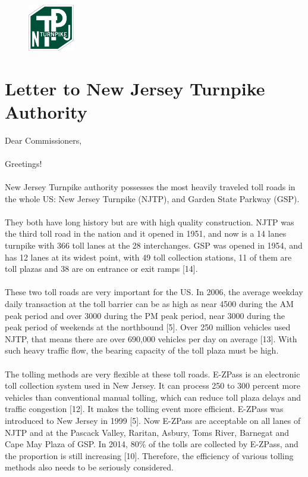 \
\begin{figure}[h]
\centering
\includegraphics[width=2cm]{NJTA.png}
\end{figure}
\section{Letter to New Jersey Turnpike Authority}
Dear Commissioners,\\
\\
Greetings!\\
\\
New Jersey Turnpike authority possesses the most heavily traveled toll roads in the whole US: New Jersey Turnpike (NJTP), and Garden State Parkway (GSP).\\ 
\\
They both have long history but are with high quality construction. NJTP was the third toll road in the nation and it opened in 1951, and now is a 14 lanes turnpike with 366 toll lanes at the 28 interchanges. GSP was opened in 1954, and has 12 lanes at its widest point, with 49 toll collection stations, 11 of them are toll plazas and 38 are on entrance or exit ramps [14].\\ 
\\
These two toll roads are very important for the US. In 2006, the average weekday daily transaction at the toll barrier can be as high as near 4500 during the AM peak period and over 3000 during the PM peak period, near 3000 during the peak period of weekends at the northbound [5]. Over 250 million vehicles used NJTP, that means there are over 690,000 vehicles per day on average [13]. With such heavy traffic flow, the bearing capacity of the toll plaza must be high.\\
\\
The tolling methods are very flexible at these toll roads. E-ZPass is an electronic toll collection system used in New Jersey. It can process 250 to 300 percent more vehicles than conventional manual tolling, which can reduce toll plaza delays and traffic congestion [12]. It makes the tolling event more efficient. E-ZPass was introduced to New Jersey in 1999 [5]. Now E-ZPass are acceptable on all lanes of NJTP and at the Pascack Valley, Raritan, Asbury, Toms River, Barnegat and Cape May Plaza of GSP. In 2014, 80\% of the tolls are collected by E-ZPass, and the proportion is still increasing [10]. Therefore, the efficiency of various tolling methods also needs to be seriously considered.\\
